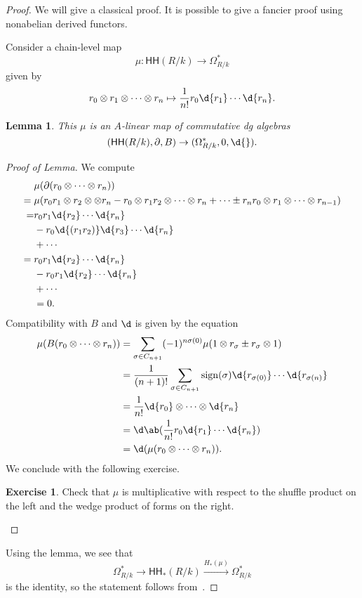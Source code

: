 \documentclass[10pt]{amsart}
\newtheorem{lem}[thm]{Lemma}
\theoremstyle{definition}
\newtheorem{exer}[thm]{Exercise}
\theoremstyle{remark}
\theoremstyle{plain}
\theoremstyle{definition}
\theoremstyle{remark}
\newcommand{\on}[1]{\operatorname{#1}}
\newcommand{\ms}[1]{\mathsf{#1}}
\newcommand{\1}{\mathbf{1}}
\newcommand{\2}{\mathbf{2}}
\newcommand{\3}{\mathbf{3}}
\newcommand{\HH}{\ms{HH}}
\begin{document}
\begin{proof}
    We will give a classical proof. It is possible to give a fancier proof using nonabelian derived functors.

    Consider a chain-level map
    \[ \mu \colon \HH(R/k) \to \Omega^*_{R/k} \]
    given by 
    \[ r_0 \otimes r_1 \otimes \cdots \otimes r_n \mapsto \frac{1}{n!} r_0 \d{r_1} \cdots \d{r_n}. \]
    \begin{lem}
        This $\mu$ is an $A$-linear map of commutative dg algebras
        \[ (\HH(R/k), \partial, B) \to (\Omega^*_{R/k}, 0, \d{}). \]
    \end{lem}
    \begin{proof}[Proof of Lemma]
        We compute
        \begin{align*}
            &\mu(\partial(r_0 \otimes \cdots \otimes r_n)) \\
            ={}& \mu (r_0 r_1 \otimes r_2 \otimes \otimes r_n - r_0 \otimes r_1 r_2 \otimes \cdots \otimes r_n + \cdots \pm r_n r_0 \otimes r_1 \otimes \cdots \otimes r_{n-1}) \\
            =&{} r_0 r_1 \d{r_2} \cdots \d{r_n} \\
            &- r_0 \d{(r_1 r_2)} \d{r_3} \cdots \d{r_n} \\
            &+ \cdots \\
            ={}& r_0 r_1 \d{r_2} \cdots \d{r_n} \\
            &- r_0 r_1 \d{r_2} \cdots \d{r_n} \\
            &+ \cdots \\
            &= 0.
        \end{align*}
        Compatibility with $B$ and $\d$ is given by the equation
        \begin{align*}
            \mu(B(r_0\otimes \cdots \otimes r_n)) &= \sum_{\sigma \in C_{n+1}} (-1)^{n\sigma(0)} \mu(1 \otimes r_{\sigma} \pm r_{\sigma} \otimes 1) \\
            &= \frac{1}{(n+1)!} \sum_{\sigma \in C_{n+1}} \on{sign}(\sigma) \d{r_{\sigma(0)}} \cdots \d{r_{\sigma(n)}} \\
            &= \frac{1}{n!} \d{r_0} \otimes \cdots \otimes \d{r_n} \\
            &= \d \ab(\frac{1}{n!} r_0 \d{r_1} \cdots \d{r_n}) \\
            &= \d(\mu(r_0 \otimes \cdots \otimes r_n)).
        \end{align*}
        We conclude with the following exercise.
        \begin{exer}
            Check that $\mu$ is multiplicative with respect to the shuffle product on the left and the wedge product of forms on the right. \qedhere
        \end{exer}
    \end{proof}
    Using the lemma, we see that
    \[ \Omega^*_{R/k} \to \HH_*(R/k) \xrightarrow{H_*(\mu)} \Omega^*_{R/k} \]
    is the identity, so the statement follows from~.
\end{proof}
\end{document}
